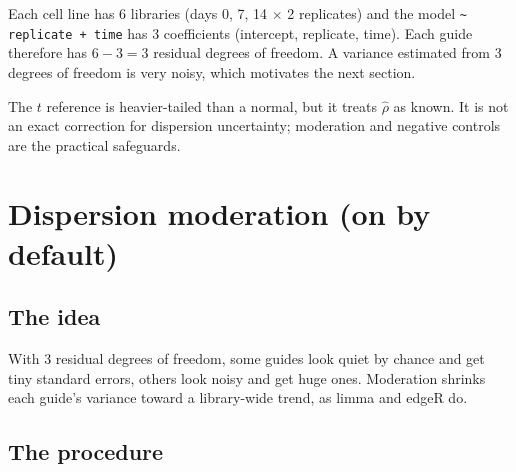 \documentclass[11pt]{article}
\begin{document}
\begin{example}
Each cell line has 6 libraries (days 0, 7, 14 $\times$ 2 replicates) and the
model \texttt{\textasciitilde{} replicate + time} has 3 coefficients
(intercept, replicate, time).  Each guide therefore has $6-3=3$ residual
degrees of freedom.  A variance estimated from 3 degrees of freedom is very
noisy, which motivates the next section.
\end{example}

The $t$ reference is heavier-tailed than a normal, but it treats
$\hat\rho$ as known.  It is not an exact correction for dispersion
uncertainty; moderation and negative controls are the practical safeguards.

\section{Dispersion moderation (on by default)}

\subsection{The idea}

With 3 residual degrees of freedom, some guides look quiet by chance and get
tiny standard errors, others look noisy and get huge ones.  Moderation shrinks
each guide's variance toward a library-wide trend, as limma and edgeR do.

\subsection{The procedure}
\end{document}
